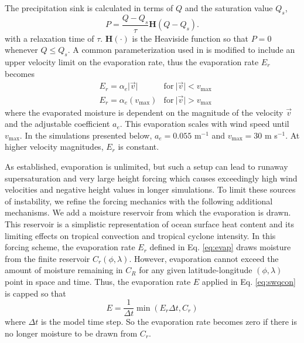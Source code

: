    The precipitation sink is calculated in terms of $Q$ and the saturation value $Q_s$,
   \begin{equation}
     \label{eq:precip} P = \frac{Q-Q_s}{\tau}\mathbf{H}(Q-Q_s).
   \end{equation}
   with a relaxation time of $\tau$. $\mathbf{H}(\cdot)$ is the Heaviside function
    so that $P = 0$ whenever $Q \leq Q_s$.
   A common parameterization used in \cite{lahaye2016understanding} is modified
   to include an upper velocity limit on the evaporation rate, thus the evaporation rate $E_r$ becomes
     \begin{align}
        \label{eq:evap} 
     &E_r  =   \alpha_e  \lvert \vec{v} \rvert & \mathrm{for} \ \lvert \vec{v} \rvert < v_\mathrm{max} \nonumber \\
     &E_r  =   \alpha_e (v_\mathrm{max}) &  \mathrm{for} \ \lvert \vec{v} \rvert > v_\mathrm{max} 
     \end{align}
   where the evaporated moisture is dependent on the magnitude of the 
   velocity $\vec{v}$ and the adjustable coefficient $a_e$. This evaporation scales 
   with wind speed until $v_{\mathrm{max}}$. In the simulations presented below,
   $a_e = 0.055$ m$^{-1}$ and $v_{\mathrm{max}} = 30$ m s$^{-1}$.
   At higher velocity magnitudes, $E_r$ is constant.
   
   As established, evaporation is unlimited, but such a setup can lead to runaway 
   supersaturation and very large height forcing which causes exceedingly high wind 
   velocities and negative height values in longer simulations.
   To limit these sources of instability, we refine the forcing mechanics with the following additional mechanisms.
   We add a moisture reservoir from which the evaporation is drawn. This reservoir is a simplistic representation of
   ocean surface heat content and its limiting effects on tropical convection and tropical cyclone intensity.
   In this forcing scheme, the evaporation rate $E_r$ defined in Eq. \ref{eq:evap} draws moisture from the finite reservoir 
    $C_r(\phi,\lambda)$. However, evaporation cannot exceed the amount
    of moisture remaining in $C_R$ for any given latitude-longitude $(\phi,\lambda)$ point in space and time.
    Thus, the evaporation rate $E$ applied in Eq. \ref{eq:swqcon} is capped so that
    \begin{equation}
      \label{eq:crlimit}
         E = \frac{1}{\Delta t}\min\left(E_r \Delta t, C_r\right)
    \end{equation}
   where $\Delta t$ is the model time step. So the evaporation 
   rate becomes zero if there is no longer moisture to be drawn from $C_r$.
    
